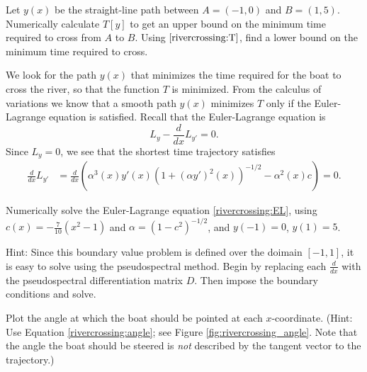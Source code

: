 \begin{problem}
	Let $y(x)$ be the straight-line path between $A = (-1,0)$ and $B=(1,5)$. Numerically calculate $T[y]$ to get an upper bound on the minimum time required to cross from $A$ to $B$. Using $\eqref{rivercrossing:T}$, find a lower bound on the minimum time required to cross.
\end{problem}

We look for the path $y(x)$ that minimizes the time required for the boat to cross the river, so that the function $T$ is minimized. From the calculus of variations we know that a smooth path $y(x)$ minimizes $T$ only if the Euler-Lagrange equation is satisfied. Recall that the Euler-Lagrange equation is 
\[
L_{y} - \frac{d}{dx}L_{y'} = 0.
\]
Since $L_y = 0$, we see that the shortest time trajectory satisfies
\begin{align}
	\frac{d}{dx}L_{y'} &=  \frac{d}{dx}\left( \alpha^3(x) y'(x) (1 + (\alpha y')^2(x))^{-1/2} - \alpha^2(x) c \right) = 0.
	\label{rivercrossing:EL}
\end{align}

\begin{problem}
Numerically solve the Euler-Lagrange equation \eqref{rivercrossing:EL}, using $c(x) = -\frac{7}{10}(x^2-1)$ and $\alpha = (1-c^2)^{-1/2}$, and $y(-1) = 0$, $y(1) = 5$. 

Hint: Since this boundary value problem is defined over the doimain $[-1,1]$, it is easy to solve using the pseudospectral method. Begin by replacing each $\frac{d}{dx}$ with the pseudospectral differentiation matrix $D$. Then impose the boundary conditions and solve.
\end{problem}

\begin{problem}
Plot the angle at which the boat should be pointed at each $x$-coordinate. (Hint: Use  Equation \eqref{rivercrossing:angle}; see Figure \ref{fig:rivercrossing_angle}. Note that the angle the boat should be steered is \emph{not} described by the tangent vector to the trajectory.)

\end{problem}

